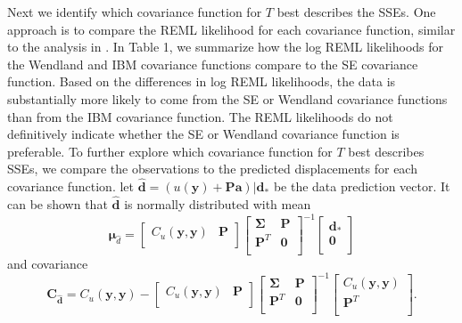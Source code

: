\documentclass[10pt,letter]{article}
\begin{document}
Next we identify which covariance function for $T$ best describes the SSEs. One approach is to compare the REML likelihood for each covariance function, similar to the analysis in \citet{Langbein2004}. In Table 1, we summarize how the log REML likelihoods for the Wendland and IBM covariance functions compare to the SE covariance function.  Based on the differences in log REML likelihoods, the data is substantially more likely to come from the SE or Wendland covariance functions than from the IBM covariance function. The REML likelihoods do not definitively indicate whether the SE or Wendland covariance function is preferable. To further explore which covariance function for $T$ best describes SSEs, we compare the observations to the predicted displacements for each covariance function. let $\hat{\bm{d}} = \left(u(\bm{y}) + \bm{P}\bm{a}\right)|\bm{d}_*$ be the data prediction vector. It can be shown that $\hat{\bm{d}}$ is normally distributed with mean 
\begin{equation}\label{eq:DataPredMean}
\bm{\mu}_{\hat{d}} = \left[\begin{array}{cc}
                           C_u(\bm{y},\bm{y}) & \bm{P} \\
                           \end{array}\right]
                     \left[\begin{array}{cc}
                           \bm{\Sigma} & \bm{P} \\
                           \bm{P}^T  & \bm{0} \\
                           \end{array}\right]^{-1}
                     \left[\begin{array}{c}
                           \bm{d}_* \\
                           \bm{0} \\
                           \end{array}\right]
\end{equation}  
and covariance
\begin{equation}\label{eq:DataPredCov}
\bm{C}_{\hat{\bm{d}}} = C_u(\bm{y},\bm{y}) - 
                        \left[\begin{array}{cc}
                              C_u(\bm{y},\bm{y}) & \bm{P} \\
                              \end{array}\right]
                        \left[\begin{array}{cc}
                              \bm{\Sigma} & \bm{P} \\
                              \bm{P}^T  & \bm{0} \\
                              \end{array}\right]^{-1}
                        \left[\begin{array}{c}
                              C_u(\bm{y},\bm{y}) \\
                              \bm{P}^T \\
                              \end{array}\right].
\end{equation}
\end{document}
